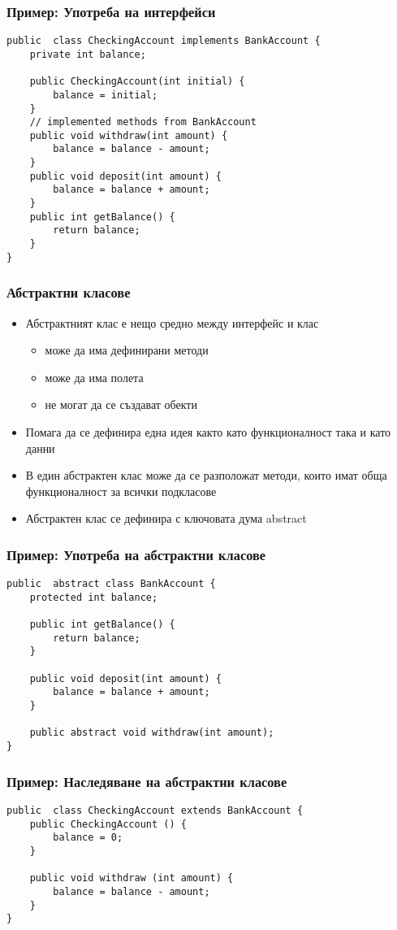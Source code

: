 \documentclass[ignorenonframetext, hyperref=unicode,compress]{beamer}
\begin{document}
\begin{frame}[containsverbatim]\frametitle{Пример: Употреба на интерфейси}
\begin{lstlisting}
public  class CheckingAccount implements BankAccount {
	private int balance;

 	public CheckingAccount(int initial) {
 		balance = initial;
	} 
 	// implemented methods from BankAccount
 	public void withdraw(int amount) {
 		balance = balance - amount;
	}
 	public void deposit(int amount) {
 		balance = balance + amount;
	}
 	public int getBalance() {
 		return balance;
	}
}
\end{lstlisting}
\end{frame}

\begin{frame}[containsverbatim]\frametitle{Абстрактни класове}
\begin{itemize}
 \item Абстрактният клас е нещо средно между интерфейс и клас
\begin{itemize}
 \item може да има дефинирани методи
 \item може да има полета
 \item не могат да се създават обекти
\end{itemize}
 \item Помага да се дефинира една идея както като функционалност така и като данни
 \item В един абстрактен клас може да се разположат методи, които имат обща функционалност за всички подкласове
 \item Абстрактен клас се дефинира с ключовата дума abstract
\end{itemize}
\end{frame}

\begin{frame}[containsverbatim]\frametitle{Пример: Употреба на абстрактни класове}
\begin{lstlisting}
public  abstract class BankAccount {
 	protected int balance;

 	public int getBalance() {
 		return balance;
	}

 	public void deposit(int amount) {
 		balance = balance + amount;
	}

 	public abstract void withdraw(int amount);
}
\end{lstlisting}
\end{frame}

\begin{frame}[containsverbatim]\frametitle{Пример: Наследяване на абстрактни класове}
\begin{lstlisting}
public  class CheckingAccount extends BankAccount {
 	public CheckingAccount () {
 		balance = 0;
	}

 	public void withdraw (int amount) {
 		balance = balance - amount;
	}
}
\end{lstlisting}
\end{frame}
\end{document}
